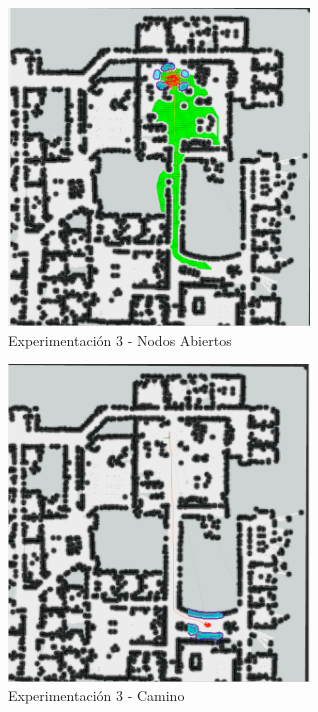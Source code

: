 \documentclass[12pt]{article}
\begin{document}
\begin{figure}[H] 
	\centering
	\includegraphics[width=8cm]{img/exp_3_1.png}
	\caption{Experimentación 3 - Nodos Abiertos}
\end{figure}


\begin{figure}[H] 
	\centering
	\includegraphics[width=8cm]{img/exp_3_2.png}
	\caption{Experimentación 3 - Camino}
\end{figure}
\end{document}
